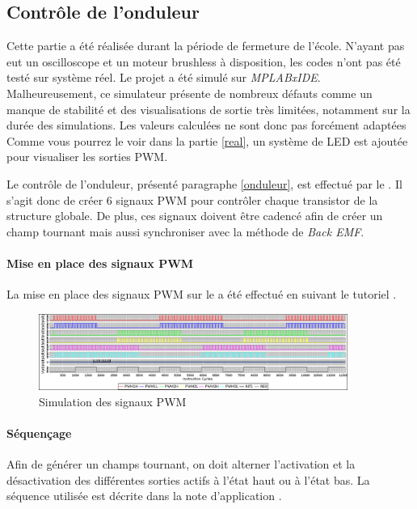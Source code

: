 			\subsection{Contrôle de l'onduleur}			
			\begin{tcolorbox}[center,width=0.9\textwidth, colframe=red!90!orange, colback=orange!25, arc=3mm,boxrule=1mm, sharp corners=east,title=Note]
			Cette partie a été réalisée durant la période de fermeture de l'école. N'ayant pas eut un oscilloscope et un moteur brushless à disposition, les codes n'ont pas été testé sur système réel. Le projet a été simulé sur \textit{MPLABxIDE}. Malheureusement, ce simulateur présente de nombreux défauts comme un manque de stabilité et des visualisations de sortie très limitées, notamment sur la durée des simulations. Les valeurs calculées ne sont donc pas forcément adaptées\\
  			Comme vous pourrez le voir dans la partie \ref{real}, un système de LED est ajoutée pour visualiser les sorties PWM. 
  			\end{tcolorbox}
  			Le contrôle de l'onduleur, présenté paragraphe \ref{onduleur}, est effectué par le \dspic . Il s'agit donc de créer 6 signaux  PWM pour contrôler chaque transistor de la structure globale. De plus, ces signaux doivent être cadencé afin de créer un champ tournant mais aussi synchroniser avec la méthode de \textit{Back EMF}.
  			\paragraph{Mise en place des signaux PWM}
  			La mise en place des signaux PWM sur le \dspic a été effectué en suivant le tutoriel \cite{PWMds}. 
  			\begin{figure}
	  			\includegraphics[width=0.9\textwidth]{../Illus/1eressaipwmSYNC.png}
	  			\caption{Simulation des signaux PWM}
  			\end{figure}
  			\paragraph{Séquençage}
  			Afin de générer un champs tournant, on doit alterner l'activation et la désactivation des différentes sorties actifs à l'état haut ou à l'état bas. La séquence utilisée est décrite dans la note d'application \cite{AN857}.
